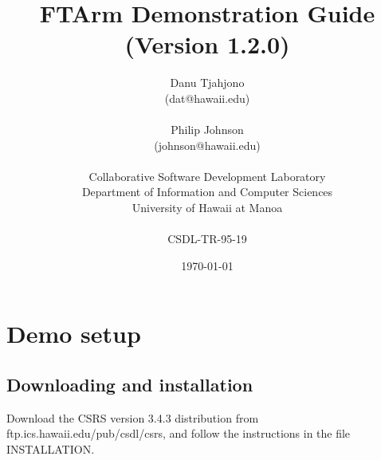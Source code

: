 





\title {FTArm Demonstration Guide \\
{\normalsize (Version 1.2.0)}}

\author 
{Danu Tjahjono \\
 (dat@hawaii.edu) \\
 \\
Philip Johnson \\
(johnson@hawaii.edu)\\
\\
Collaborative Software Development Laboratory\\
Department of Information and Computer Sciences\\
University of Hawaii at Manoa\\
\\
CSDL-TR-95-19}
\date \today
\maketitle
\newpage
\tableofcontents
\newpage


\section{Demo setup}
\subsection {Downloading and installation}
 Download the CSRS version 3.4.3 distribution from 
 ftp.ics.hawaii.edu/pub/csdl/csrs, and follow the
  instructions in the file INSTALLATION.  

